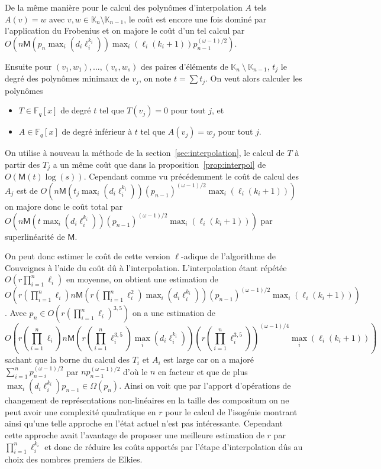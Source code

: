 \documentclass[10pt,a4paper]{book}
\theoremstyle{plain}
\theoremstyle{definition}
\theoremstyle{definition}
\theoremstyle{definition}
\theoremstyle{definition}
\theoremstyle{remark}
\theoremstyle{remark}
\theoremstyle{definition}
\begin{document}
De la même manière pour le calcul des polynômes d'interpolation $A$ tels 
$A(v)=w$ avec $v,w \in \mathbb{K}_n \setminus \mathbb{K}_{n-1}$, le coût est
encore une fois dominé par l'application du Frobenius et on majore le coût d'un
tel calcul par $O(n\mathsf{M}(p_n \max_i(d_i\ell_i^{k_i}))
\max_i(\ell_i(k_i+1))p_{n-1}^{(\omega-1)/2})$.

Ensuite pour $(v_1,w_1),\dots,(v_s,w_s)$ des paires d'éléments de $\mathbb{K}_n~\setminus~\mathbb{K}_{n-1}$, $t_j$ le degré des polynômes minimaux de $v_j$, on note  $t=\sum t_j$. 
On veut alors calculer les polynômes
  \begin{itemize}
  \item $T\in \mathbb{F}_q[x]$ de degré $t$ tel que $T(v_j)=0$ pour tout $j$,
    et
  \item $A\in \mathbb{F}_q[x]$ de degré inférieur à $t$ tel que $A(v_j)=w_j$ pour
    tout $j$.
  \end{itemize}
On utilise à nouveau la méthode de la section~\ref{sec:interpolation}, le 
calcul de $T$ à partir des $T_j$ a un même
coût que dans la proposition~\ref{prop:interpol} de $O(\mathsf{M}(t)\log(s))$. 
Cependant comme vu précédemment le coût de calcul des $A_j$ est de 
$O(n\mathsf{M}(t_j\max_i(d_i\ell_i^{k_i}))(p_{n-1})^{(\omega-1)/2}
\max_i(\ell_i(k_i+1)))$ on majore donc le coût total par $O(n\mathsf{M}(t\max_i(d_i
\ell_i^{k_i}))(p_{n-1})^{(\omega-1)/2}\max_i(\ell_i(k_i+1)))$ par superlinéarité de 
$\mathsf{M}$.

On peut donc estimer le coût de cette version $\ell$-adique de l'algorithme de 
Couveignes à l'aide du coût dû à l'interpolation. 
L'interpolation étant répétée $O(r \prod_{i=1}^n\ell_i)$ en moyenne, on obtient
une estimation de $O(r (\prod_{i=1}^n\ell_i)n\mathsf{M}(r (\prod_{i=1}^n \ell_i^2)
\max_i(d_i\ell_i^{k_i}))(p_{n-1})^{(\omega-1)/2}\max_i(\ell_i (k_i +1)) )$. 
Avec $p_n \in O(r(\prod_{i=1}^n\ell_i)^{3,5})$ on a une estimation 
de 
\[ 
O(r(\prod_{i=1}^n\ell_i)n\mathsf{M}(r (\prod_{i=1}^n \ell_i^{3,5})
\max_i(d_i\ell_i^{k_i}))(r (\prod_{i=1}^n \ell_i^{3,5}))^{(\omega-1)/4}
\max_i(\ell_i(k_i+1)) )
\]
sachant que la borne du calcul des $T_i$ et $A_i$ est large car on a majoré 
$\sum_{i=1}^np_{n-i}^{(\omega-1)/2}$ par $np_{n-1}^{(\omega-1)/2}$ d'où le 
$n$ en facteur et que de plus 
$\max_i(d_i\ell_i^{k_i})p_{n-1} \in \Omega(p_n)$. Ainsi on voit que par 
l'apport d'opérations de changement de représentations non-linéaires en la 
taille des compositum on ne peut avoir une complexité quadratique en $r$ pour
le calcul de l'isogénie montrant ainsi qu'une telle approche en l'état actuel
n'est pas intéressante. Cependant cette approche avait l'avantage de proposer
une meilleure estimation de $r$ par $\prod_{i=1}^n \ell_i^{k_i}$ et donc de 
réduire les coûts apportés par l'étape d'interpolation dûs au choix des
nombres premiers de Elkies.
\end{document}
